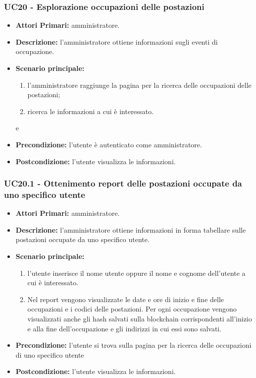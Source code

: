 \subsubsection{ UC20 - Esplorazione occupazioni delle postazioni}
\begin{itemize}
	\item\textbf{Attori Primari:} 
	amministratore.
	\item\textbf{Descrizione:} 
	l'amministratore ottiene informazioni sugli eventi di occupazione.
	\item\textbf{Scenario principale:} 
	\begin{enumerate}
		\item l'amministratore raggiunge la pagina per la ricerca delle occupazioni delle postazioni;
		\item ricerca le informazioni a cui è interessato.
	\end{enumerate}	 e 
	\item\textbf{Precondizione:} 
	l'utente è autenticato come amministratore.
	\item\textbf{Postcondizione:}
	l'utente visualizza le informazioni.
\end{itemize}

\subsubsection{ UC20.1 - Ottenimento report delle postazioni occupate da uno specifico utente}
\begin{itemize}
           	\item\textbf{Attori Primari:} 
           	amministratore.
           	\item\textbf{Descrizione:} 
           	l'amministratore ottiene informazioni in forma tabellare sulle postazioni occupate da uno specifico utente.
           	\item\textbf{Scenario principale:} 
           	\begin{enumerate}
           		\item l'utente inserisce il nome utente oppure il nome e cognome dell'utente a cui è interessato.
           		\item Nel report vengono visualizzate le date e ore di inizio e fine delle occupazioni e i codici delle postazioni.
           		Per ogni occupazione vengono visualizzati anche gli hash salvati sulla blockchain corrispondenti all'inizio e alla fine dell'occupazione e gli indirizzi in cui essi sono salvati.
           	\end{enumerate}
           	\item\textbf{Precondizione:} 
           	l'utente si trova sulla pagina per la ricerca delle occupazioni di uno specifico utente
           	\item\textbf{Postcondizione:}
           	l'utente visualizza le informazioni.
\end{itemize}

